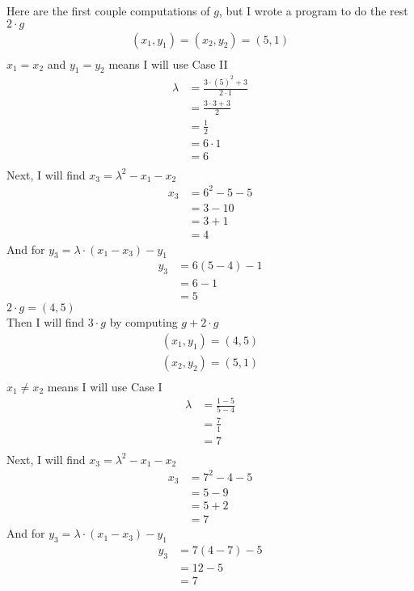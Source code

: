 \documentclass{article}
\begin{document}
Here are the first couple computations of $g$, but I wrote a program to do the rest
\\
$2\cdot g$
\[
\begin{split}
(x_1, y_1) = (x_2, y_2) = (5, 1) \\
\end{split}
\]
$x_1 = x_2$ and $y_1 = y_2$ means I will use Case II
\[
\begin{split}
\lambda &= \frac{3\cdot (5)^2 + 3}{2\cdot 1} \\
&= \frac{3\cdot 3 + 3}{2} \\
&= \frac{1}{2} \\
&= 6\cdot 1\\
&= 6\\
\end{split}
\]
Next, I will find $x_3 = \lambda^{2} - x_1 - x_2$
\[
\begin{split}
x_3 &= 6^2 - 5 - 5 \\
&= 3 - 10 \\
&= 3 + 1 \\
&= 4
\end{split}
\]
And for $y_3 = \lambda \cdot(x_1 - x_3) - y_1$
\[
\begin{split}
y_3 &= 6(5 - 4) - 1 \\
&= 6 - 1 \\
&= 5
\end{split}
\]
$2\cdot g = (4, 5)$
\\
Then I will find $3\cdot g$ by computing $g + 2\cdot g$
\[
\begin{split}
(x_1, y_1) = (4, 5) \\
(x_2, y_2) = (5, 1) \\
\end{split}
\]
$x_1 \ne x_2$ means I will use Case I
\[
\begin{split}
\lambda &= \frac{1 - 5}{5 - 4} \\
&= \frac{7}{1} \\
&= 7\\
\end{split}
\]
Next, I will find $x_3 = \lambda^{2} - x_1 - x_2$
\[
\begin{split}
x_3 &= 7^2 - 4 - 5 \\
&= 5 - 9 \\
&= 5 + 2 \\
&= 7
\end{split}
\]
And for $y_3 = \lambda \cdot(x_1 - x_3) - y_1$
\[
\begin{split}
y_3 &= 7(4 - 7) - 5 \\
&= 12 - 5 \\
&= 7
\end{split}
\]
\end{document}

